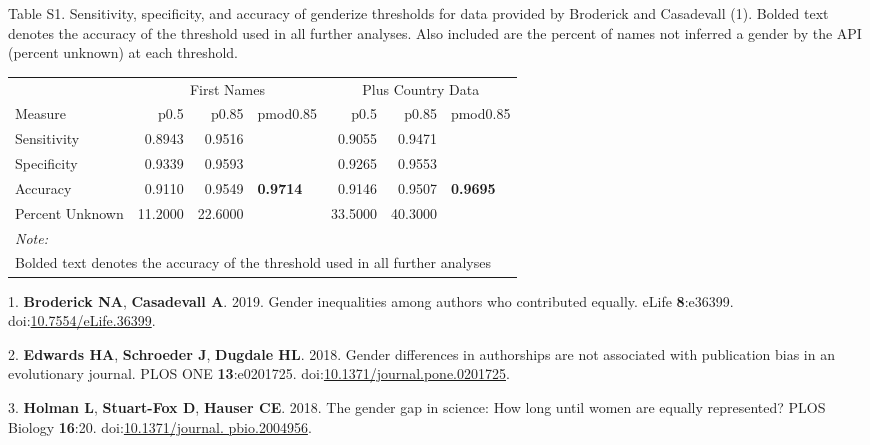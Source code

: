 \documentclass[11pt,]{article}
\begin{document}
\vspace{20mm}

Table S1. Sensitivity, specificity, and accuracy of genderize thresholds
for data provided by Broderick and Casadevall (1). Bolded text denotes
the accuracy of the threshold used in all further analyses. Also
included are the percent of names not inferred a gender by the API
(percent unknown) at each threshold.

\begin{table}[H]
\centering
\begin{tabular}{l|r|r|l|r|r|l}
\hline
\multicolumn{1}{c|}{ } & \multicolumn{3}{c|}{First Names} & \multicolumn{3}{c}{Plus Country Data} \\
\cline{2-4} \cline{5-7}
Measure & p0.5 & p0.85 & pmod0.85 & p0.5 & p0.85 & pmod0.85\\
\hline
Sensitivity & 0.8943 & 0.9516 & \cellcolor{white}{0.971} & 0.9055 & 0.9471 & \cellcolor{white}{0.9669}\\
\hline
Specificity & 0.9339 & 0.9593 & \cellcolor{white}{0.972} & 0.9265 & 0.9553 & \cellcolor{white}{0.9727}\\
\hline
Accuracy & 0.9110 & 0.9549 & \textbf{0.9714} & 0.9146 & 0.9507 & \textbf{0.9695}\\
\hline
Percent Unknown & 11.2000 & 22.6000 & \cellcolor{white}{34.6} & 33.5000 & 40.3000 & \cellcolor{white}{58.7}\\
\hline
\multicolumn{7}{l}{\textit{Note: }}\\
\multicolumn{7}{l}{Bolded text denotes the accuracy of the threshold used in all further analyses}\\
\end{tabular}
\end{table}

\hypertarget{refs}{}
\leavevmode\hypertarget{ref-broderick_gender_2019}{}%
1. \textbf{Broderick NA}, \textbf{Casadevall A}. 2019. Gender
inequalities among authors who contributed equally. eLife
\textbf{8}:e36399.
doi:\href{https://doi.org/10.7554/eLife.36399}{10.7554/eLife.36399}.

\leavevmode\hypertarget{ref-edwards_gender_2018}{}%
2. \textbf{Edwards HA}, \textbf{Schroeder J}, \textbf{Dugdale HL}. 2018.
Gender differences in authorships are not associated with publication
bias in an evolutionary journal. PLOS ONE \textbf{13}:e0201725.
doi:\href{https://doi.org/10.1371/journal.pone.0201725}{10.1371/journal.pone.0201725}.

\leavevmode\hypertarget{ref-holman_gender_2018}{}%
3. \textbf{Holman L}, \textbf{Stuart-Fox D}, \textbf{Hauser CE}. 2018.
The gender gap in science: How long until women are equally represented?
PLOS Biology \textbf{16}:20.
doi:\href{https://doi.org/10.1371/journal.\%20pbio.2004956}{10.1371/journal. pbio.2004956}.
\end{document}
